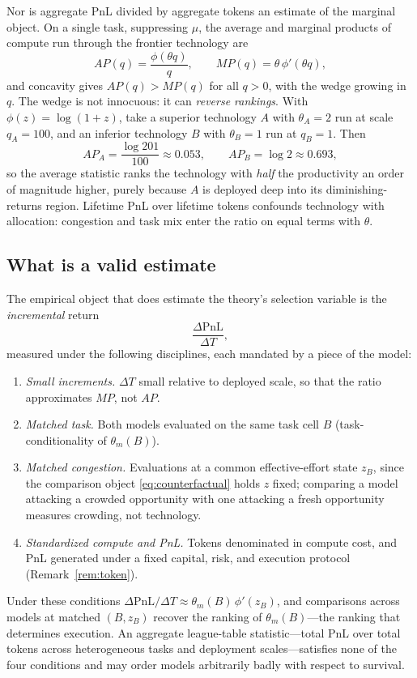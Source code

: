 \documentclass[11pt]{article}
\theoremstyle{definition}
\theoremstyle{remark}
\newcommand{\PnL}{\mathrm{PnL}}
\begin{document}
Nor is aggregate PnL divided by aggregate tokens an estimate of the marginal object. On a single task, suppressing $\mu$, the average and marginal products of compute run through the frontier technology are
\begin{equation}
AP(q) = \frac{\phi(\theta q)}{q},
\qquad
MP(q) = \theta\, \phi'(\theta q),
\end{equation}
and concavity gives $AP(q) > MP(q)$ for all $q > 0$, with the wedge growing in $q$. The wedge is not innocuous: it can \emph{reverse rankings}. With $\phi(z) = \log(1+z)$, take a superior technology $A$ with $\theta_A = 2$ run at scale $q_A = 100$, and an inferior technology $B$ with $\theta_B = 1$ run at $q_B = 1$. Then
\begin{equation}
AP_A = \frac{\log 201}{100} \approx 0.053,
\qquad
AP_B = \log 2 \approx 0.693,
\end{equation}
so the average statistic ranks the technology with \emph{half} the productivity an order of magnitude higher, purely because $A$ is deployed deep into its diminishing-returns region. Lifetime PnL over lifetime tokens confounds technology with allocation: congestion and task mix enter the ratio on equal terms with $\theta$.

\subsection{What is a valid estimate}

The empirical object that does estimate the theory's selection variable is the \emph{incremental} return
\begin{equation}
\frac{\Delta \PnL}{\Delta T},
\end{equation}
measured under the following disciplines, each mandated by a piece of the model:
\begin{enumerate}[itemsep=2pt]
\item \emph{Small increments.} $\Delta T$ small relative to deployed scale, so that the ratio approximates $MP$, not $AP$.
\item \emph{Matched task.} Both models evaluated on the same task cell $B$ (task-conditionality of $\theta_m(B)$).
\item \emph{Matched congestion.} Evaluations at a common effective-effort state $z_B$, since the comparison object \eqref{eq:counterfactual} holds $z$ fixed; comparing a model attacking a crowded opportunity with one attacking a fresh opportunity measures crowding, not technology.
\item \emph{Standardized compute and PnL.} Tokens denominated in compute cost, and PnL generated under a fixed capital, risk, and execution protocol (Remark~\ref{rem:token}).
\end{enumerate}
Under these conditions $\Delta\PnL/\Delta T \approx \theta_m(B)\,\phi'(z_B)$, and comparisons across models at matched $(B, z_B)$ recover the ranking of $\theta_m(B)$---the ranking that determines execution. An aggregate league-table statistic---total PnL over total tokens across heterogeneous tasks and deployment scales---satisfies none of the four conditions and may order models arbitrarily badly with respect to survival.
\end{document}
